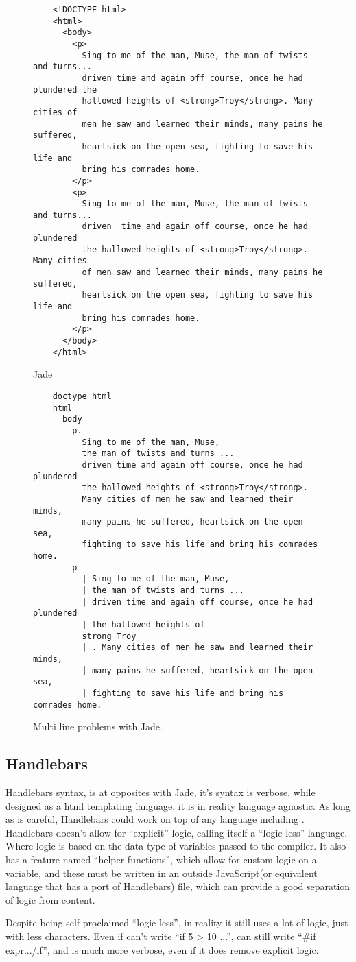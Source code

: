 \begin{figure}[ht!]
    \large{}\normalsize{}
    \begin{verbatim}
    <!DOCTYPE html>
    <html>
      <body>
        <p>
          Sing to me of the man, Muse, the man of twists and turns... 
          driven time and again off course, once he had plundered the
          hallowed heights of <strong>Troy</strong>. Many cities of 
          men he saw and learned their minds, many pains he suffered, 
          heartsick on the open sea, fighting to save his life and 
          bring his comrades home.
        </p>
        <p>
          Sing to me of the man, Muse, the man of twists and turns... 
          driven  time and again off course, once he had plundered
          the hallowed heights of <strong>Troy</strong>. Many cities
          of men saw and learned their minds, many pains he suffered, 
          heartsick on the open sea, fighting to save his life and 
          bring his comrades home.
        </p>
      </body>
    </html>
    \end{verbatim}
    \large{Jade}\normalsize{}
    \begin{verbatim}
    doctype html
    html
      body
        p.
          Sing to me of the man, Muse, 
          the man of twists and turns ... 
          driven time and again off course, once he had plundered 
          the hallowed heights of <strong>Troy</strong>. 
          Many cities of men he saw and learned their minds, 
          many pains he suffered, heartsick on the open sea, 
          fighting to save his life and bring his comrades home. 
        p
          | Sing to me of the man, Muse, 
          | the man of twists and turns ... 
          | driven time and again off course, once he had plundered 
          | the hallowed heights of 
          strong Troy 
          | . Many cities of men he saw and learned their minds, 
          | many pains he suffered, heartsick on the open sea, 
          | fighting to save his life and bring his comrades home. 
    \end{verbatim}
    \caption{Multi line problems with Jade.}
    \label{fig:JadeMultiLine}
\end{figure}


\subsection{Handlebars}

Handlebars syntax, is at opposites with Jade, it's syntax is verbose, while designed as a html templating language, it is in reality language agnostic. As long as \you{} is careful, Handlebars could work on top of any language including \languageName{}. Handlebars doesn't allow for ``explicit'' logic, calling itself a ``logic-less'' language. Where logic is based on the data type of variables passed to the compiler. It also has a feature named ``helper functions'', which allow for custom logic on a variable, and these must be written in an outside JavaScript(or equivalent language that has a port of Handlebars) file, which can provide a good separation of logic from content.

Despite being self proclaimed ``logic-less'', in reality it still uses a lot of logic, just with less characters. Even if \you{} can't write ``if 5 > 10 {...}'', \you{} can still write ``{{#if expr}}...{{/if}}'', and is much more verbose, even if it does remove explicit logic.